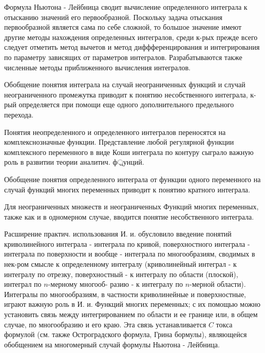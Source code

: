 \documentclass[10pt]{article}
\begin{document}
Формула Ньютона - Лейбница сводит вычисление определенного интеграла к отысканию значений его первообразной. Поскольку задача отыскания первообразной является сама по себе сложной, то большое значение имеют другие методы нахождения определенных интегралов, среди к-рых прежде всего следует отметить метод вычетов и метод диффференцирования и интегрирования по параметру зависящих от параметров интегралов. Разрабатываются также численные методы приближенного вычисления интегралов.



Обобщение понятия интеграла на случай неограниченных функций и случай неограниченного промежутка приводит к понятию несобственного интеграла, к-рый определяется при помощи еще одного дополнительного предельного перехода.



Понятия неопределенного и определенного интегралов переносятся на комплекснозначные функции. Представление любой регулярной функции комплексного переменного в виде Коши интеграла по контуру сыграло важную роль в развитии теории аналитич. ф্রунций.



Обобщение понятия определенного интеграла от функции одного переменного на случай функций многих переменных приводит к понятию кратного интеграла.



Для неограниченных множеств и неограниченных Функций многих переменных, также как и в одномерном случае, вводится понятие несобственного интеграла.



Расширение практич. использования И. и. обусловило введение понятий криволинейного интеграла - интеграла по кривой, поверхностного интеграла - интеграла по поверхности и вообще - интеграла по многообразиям, сводимых в нек-ром смысле к определенному интегралу (криволинейный интеграл - к интегралу по отрезку, поверхностный - к интегралу по области (плоской), интеграл по $n$-мерному многооб- разию - к интегралу по $n$-мерной области). Интегралы по многообразиям, в частности криволинейные и поверхностные, играют важную роль в И. и. Функций многих переменных; с их помощью можно установить связь между интегрированием по области и ее границе или, в общем случае, по многообразию и его краю. Эта связь устанавливается $C$ токса формулой (см. также Остроградского формула, Грина бормулы), являющеӥся обобщением на многомерный случай формулы Ньютона - Лейбница.
\end{document}
